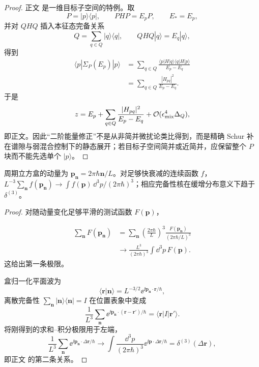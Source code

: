 \begin{proof}
正文 是一维目标子空间的特例。取
\[
P=|p\rangle\langle p|,
\qquad
PHP=E_pP,
\qquad
E_*=E_p,
\]
并对 \(QHQ\) 插入本征态完备关系
\[
Q
=
\sum_{q\in Q}|q\rangle\langle q|,
\qquad
QHQ|q\rangle=E_q|q\rangle,
\]
得到
\begin{align*}
\langle p|\Sigma_P(E_p)|p\rangle
&=
\sum_{q\in Q}
\frac{
\langle p|H|q\rangle
\langle q|H|p\rangle
}{E_p-E_q}\\
&=
\sum_{q\in Q}
\frac{|H_{pq}|^2}{E_p-E_q}.
\end{align*}
于是
\[
z
=
E_p
+
\sum_{q\in Q}
\frac{|H_{pq}|^2}{E_p-E_q}
+
\mathcal O(\epsilon_{\rm mix}^4\Delta_Q),
\]
即正文。因此“二阶能量修正”不是从非简并微扰论类比得到，而是精确 Schur 补在谱隙与弱混合控制下的静态展开；若目标子空间简并或近简并，应保留整个 \(P\) 块而不能先选单个 \(|p\rangle\)。
\end{proof}

\begin{proposition}[盒归一化的连续谱极限]
周期立方盒的动量为 $\mathbf p_{\mathbf n}=2\pi\hbar\mathbf n/L$。对足够快衰减的连续函数 $f$，$L^{-3}\sum_{\mathbf n}f(\mathbf p_{\mathbf n})\to\int f(\mathbf p)\,\dd^3p/(2\pi\hbar)^3$；相应完备性核在缓增分布意义下趋于 $\delta^{(3)}$。
\end{proposition}
\begin{proof}
对随动量变化足够平滑的测试函数 $F(\mathbf p)$，

\begin{align*}
 \sum_{\mathbf n}F(\mathbf p_{\mathbf n})
 &=\sum_{\mathbf n}
 \left(\frac{2\pi\hbar}{L}\right)^3
 \frac{F(\mathbf p_{\mathbf n})}{(2\pi\hbar/L)^3}\\
 &\longrightarrow
 \frac{L^3}{(2\pi\hbar)^3}
 \int\dd^3 p\,F(\mathbf p).
\end{align*}
这给出第一条极限。

盒归一化平面波为
\begin{equation*}
 \langle\mathbf r|\mathbf n\rangle
 =L^{-3/2}\ee^{\ii\mathbf p_{\mathbf n}\cdot\mathbf r/\hbar},
\end{equation*}
离散完备性
$\sum_{\mathbf n}|\mathbf n\rangle\langle\mathbf n|=I$
在位置表象中变成
\begin{equation*}
 \frac1{L^3}\sum_{\mathbf n}
 \ee^{\ii\mathbf p_{\mathbf n}\cdot(\mathbf r-\mathbf r')/\hbar}
 =\langle\mathbf r|I|\mathbf r'\rangle.
\end{equation*}
将刚得到的求和--积分极限用于左端，
\begin{equation*}
 \frac1{L^3}\sum_{\mathbf n}
 \ee^{\ii\mathbf p_{\mathbf n}\cdot\Delta\mathbf r/\hbar}
 \longrightarrow
 \int\frac{\dd^3 p}{(2\pi\hbar)^3}
 \ee^{\ii\mathbf p\cdot\Delta\mathbf r/\hbar}
 =\delta^{(3)}(\Delta\mathbf r),
\end{equation*}
即正文 的第二条关系。
\end{proof}

